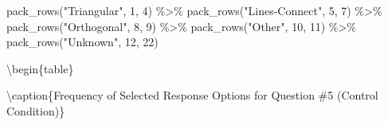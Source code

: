 \documentclass[
  letterpaper,
  DIV=11,
  numbers=noendperiod]{scrreprt}
\newenvironment{Shaded}{\begin{snugshade}}{\end{snugshade}}
\newcommand{\DecValTok}[1]{\textcolor[rgb]{0.68,0.00,0.00}{#1}}
\newcommand{\FunctionTok}[1]{\textcolor[rgb]{0.28,0.35,0.67}{#1}}
\newcommand{\NormalTok}[1]{\textcolor[rgb]{0.00,0.23,0.31}{#1}}
\newcommand{\SpecialCharTok}[1]{\textcolor[rgb]{0.37,0.37,0.37}{#1}}
\newcommand{\StringTok}[1]{\textcolor[rgb]{0.13,0.47,0.30}{#1}}
\begin{document}
\begin{Shaded}
\begin{Highlighting}[]
  \FunctionTok{pack\_rows}\NormalTok{(}\StringTok{"Triangular"}\NormalTok{, }\DecValTok{1}\NormalTok{, }\DecValTok{4}\NormalTok{) }\SpecialCharTok{\%\textgreater{}\%} 
  \FunctionTok{pack\_rows}\NormalTok{(}\StringTok{"Lines{-}Connect"}\NormalTok{, }\DecValTok{5}\NormalTok{, }\DecValTok{7}\NormalTok{) }\SpecialCharTok{\%\textgreater{}\%} 
  \FunctionTok{pack\_rows}\NormalTok{(}\StringTok{"Orthogonal"}\NormalTok{, }\DecValTok{8}\NormalTok{, }\DecValTok{9}\NormalTok{) }\SpecialCharTok{\%\textgreater{}\%} 
  \FunctionTok{pack\_rows}\NormalTok{(}\StringTok{"Other"}\NormalTok{, }\DecValTok{10}\NormalTok{, }\DecValTok{11}\NormalTok{) }\SpecialCharTok{\%\textgreater{}\%} 
  \FunctionTok{pack\_rows}\NormalTok{(}\StringTok{"Unknown"}\NormalTok{, }\DecValTok{12}\NormalTok{, }\DecValTok{22}\NormalTok{) }
\end{Highlighting}
\end{Shaded}

\textbackslash begin\{table\}

\textbackslash caption\{\label{tab:Q5-CONTROL-RESPONSES}Frequency of
Selected Response Options for Question \#5 (Control Condition)\}
\centering
\end{document}
